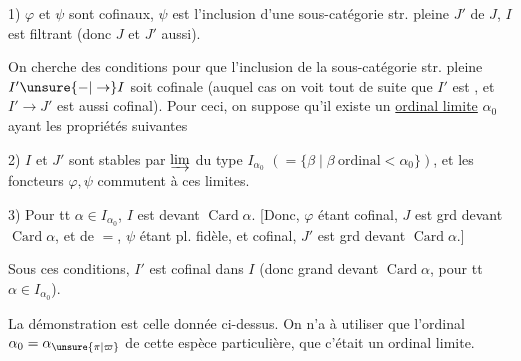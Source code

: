 
1) $\varphi$ et $\psi$ sont cofinaux, $\psi$ est l'inclusion d'une sous-catégorie str. pleine $J'$ de $J$, $I$ est filtrant (donc $J$ et $J'$ aussi).

On cherche des conditions pour que l'inclusion  de la sous-catégorie str. pleine $I'\unsure{-|\to}I$ soit cofinale (auquel cas on voit tout de suite que $I'$ est , et $I'\to J'$ est aussi cofinal). Pour ceci, on suppose qu'il existe un \uline{ordinal limite} $\alpha_0$ ayant les propriétés  suivantes

2) $I$ et $J'$ sont stables par $\varinjlim$ du type $I_{\alpha_0}$ $(=\{\beta\mid\beta\ \text{ordinal}<\alpha_0\})$, et les foncteurs $\varphi,\psi$ commutent à ces limites.

3) Pour tt $\alpha\in I_{\alpha_0}$, $I$ est   devant $\operatorname{Card}\alpha$. [Donc, $\varphi$ étant cofinal, $J$ est  grd devant $\operatorname{Card}\alpha$, et de $=$, $\psi$ étant pl. fidèle, et cofinal, $J'$ est grd devant $\operatorname{Card}\alpha$.]

Sous ces conditions, $I'$ est cofinal dans $I$ (donc  grand devant $\operatorname{Card}\alpha$, pour tt $\alpha\in I_{\alpha_0}$).

La démonstration est celle donnée  ci-dessus. On n'a  à utiliser que l'ordinal $\alpha_0=\alpha_{\unsure{\pi|\varpi}}$  de cette espèce particulière,  que c'était un ordinal limite.
